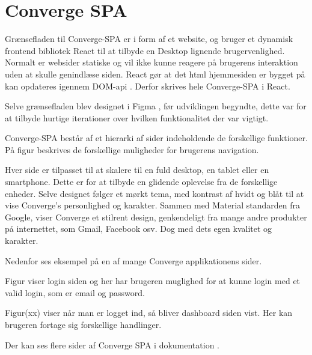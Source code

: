 \section{Converge SPA}
Grænsefladen til Converge-SPA er i form af et website, og bruger et dynamisk frontend bibliotek React til at tilbyde en Desktop lignende brugervenlighed. Normalt er websider statiske og vil ikke kunne reagere på brugerens interaktion uden at skulle genindlæse siden. React gør at det html hjemmesiden er bygget på kan opdateres igennem DOM-api \cite[Dom-API]{converge-terms}. Derfor skrives hele Converge-SPA i React. 

Selve grænsefladen blev designet i Figma \cite[Figma]{converge-terms}, før udviklingen begyndte, dette var for at tilbyde hurtige iterationer over hvilken funktionalitet der var vigtigt.

Converge-SPA består af et hierarki af sider indeholdende de forskellige funktioner. På figur  beskrives de forskellige muligheder for brugerens navigation.


Hver side er tilpasset til at skalere til en fuld desktop, en tablet eller en smartphone. Dette er for at tilbyde en glidende oplevelse fra de forskellige enheder. Selve designet følger et mørkt tema, med kontrast af hvidt og blåt til at vise Converge’s personlighed og karakter. Sammen med Material standarden fra Google, viser Converge et stilrent design, genkendeligt fra mange andre produkter på internettet, som Gmail, Facebook osv. Dog med dets egen kvalitet og karakter.

Nedenfor ses eksempel på en af mange Converge applikationens sider.


Figur viser login siden og her har brugeren muglighed for at kunne login med et valid login, som er
email og password.


Figur(xx) viser når man er logget ind, så bliver dashboard siden vist. Her kan
brugeren fortage sig forskellige handlinger. 

Der kan ses flere sider af Converge SPA i dokumentation \cite{system-interface}.